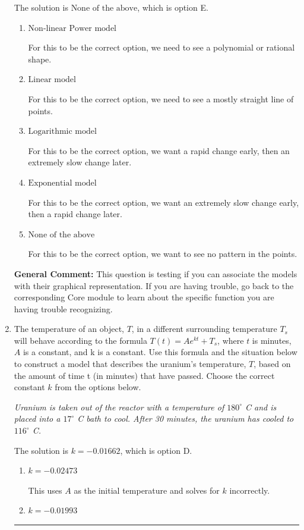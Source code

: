 \documentclass{extbook}[14pt]
\newcommand{\litem}[1]{\item #1

\rule{\textwidth}{0.4pt}}
\begin{document}
\begin{enumerate}
{The solution is \( \text{None of the above} \), which is option E.\begin{enumerate}[label=\Alph*.]
\item \( \text{Non-linear Power model} \)

For this to be the correct option, we need to see a polynomial or rational shape.
\item \( \text{Linear model} \)

For this to be the correct option, we need to see a mostly straight line of points.
\item \( \text{Logarithmic model} \)

For this to be the correct option, we want a rapid change early, then an extremely slow change later.
\item \( \text{Exponential model} \)

For this to be the correct option, we want an extremely slow change early, then a rapid change later.
\item \( \text{None of the above} \)

For this to be the correct option, we want to see no pattern in the points.
\end{enumerate}

\textbf{General Comment:} This question is testing if you can associate the models with their graphical representation. If you are having trouble, go back to the corresponding Core module to learn about the specific function you are having trouble recognizing.
}
\litem{
The temperature of an object, $T$, in a different surrounding temperature $T_s$ will behave according to the formula $T(t) = Ae^{kt} + T_s$, where $t$ is minutes, $A$ is a constant, and k is a constant. Use this formula and the situation below to construct a model that describes the uranium's temperature, $T$, based on the amount of time t (in minutes) that have passed. Choose the correct constant $k$ from the options below.

\begin{center}
    \textit{ Uranium is taken out of the reactor with a temperature of $180^{\circ}$ C and is placed into a $17^{\circ}$ C bath to cool. After 30 minutes, the uranium has cooled to $116^{\circ}$ C. }
\end{center}
The solution is \( k = -0.01662 \), which is option D.\begin{enumerate}[label=\Alph*.]
\item \( k = -0.02473 \)

This uses $A$ as the initial temperature and solves for $k$ incorrectly.
\item \( k = -0.01993 \)


\end{enumerate}}
\end{enumerate}
\end{document}
